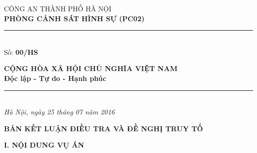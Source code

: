 \documentclass[12pt,a4paper]{article}
\begin{document}
\noindent
\begin{minipage}[t]{0.46\textwidth}
    \begin{center}
        \fontsize{11pt}{13pt}\selectfont
        CÔNG AN THÀNH PHỐ HÀ NỘI\\
        \textbf{PHÒNG CẢNH SÁT HÌNH SỰ (PC02)}\\[-0.2em]
        \rule{3.2cm}{0.6pt}\\[0.25cm]
        \fontsize{11pt}{13pt}\selectfont Số: \textbf{00/HS}
    \end{center}
\end{minipage}
\hfill
\begin{minipage}[t]{0.52\textwidth}
    \begin{center}
        \fontsize{11pt}{13pt}\selectfont
        \textbf{CỘNG HÒA XÃ HỘI CHỦ NGHĨA VIỆT NAM}\\
        \textbf{Độc lập - Tự do - Hạnh phúc}\\[-0.2em]
        \rule{3.6cm}{0.6pt}\\[0.25cm]
        \textit{Hà Nội, ngày 25 tháng 07 năm 2016}
    \end{center}
\end{minipage}

\vspace{0.5cm}

\begin{center}
    \textbf{\Large BẢN KẾT LUẬN ĐIỀU TRA VÀ ĐỀ NGHỊ TRUY TỐ}\\[0.15cm]
    \textit{}
\end{center}

\vspace{0.3cm}



\vspace{0.3cm}\noindent\textbf{\large I. NỘI DUNG VỤ ÁN}\\[0.15cm]
\end{document}
